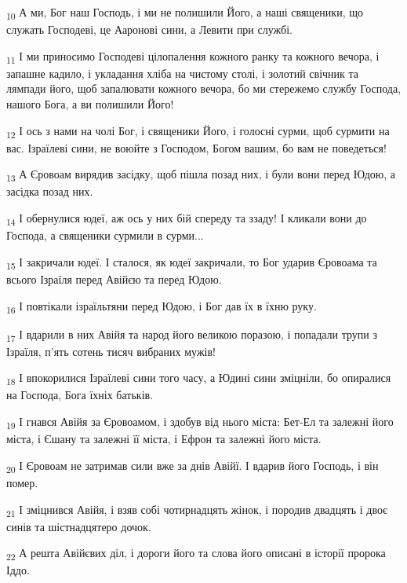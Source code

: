 \begin{tcolorbox}
\textsubscript{10} А ми, Бог наш Господь, і ми не полишили Його, а наші священики, що служать Господеві, це Ааронові сини, а Левити при службі.
\end{tcolorbox}
\begin{tcolorbox}
\textsubscript{11} І ми приносимо Господеві цілопалення кожного ранку та кожного вечора, і запашне кадило, і укладання хліба на чистому столі, і золотий свічник та лямпади його, щоб запалювати кожного вечора, бо ми стережемо службу Господа, нашого Бога, а ви полишили Його!
\end{tcolorbox}
\begin{tcolorbox}
\textsubscript{12} І ось з нами на чолі Бог, і священики Його, і голосні сурми, щоб сурмити на вас. Ізраїлеві сини, не воюйте з Господом, Богом вашим, бо вам не поведеться!
\end{tcolorbox}
\begin{tcolorbox}
\textsubscript{13} А Єровоам вирядив засідку, щоб пішла позад них, і були вони перед Юдою, а засідка позад них.
\end{tcolorbox}
\begin{tcolorbox}
\textsubscript{14} І обернулися юдеї, аж ось у них бій спереду та ззаду! І кликали вони до Господа, а священики сурмили в сурми...
\end{tcolorbox}
\begin{tcolorbox}
\textsubscript{15} І закричали юдеї. І сталося, як юдеї закричали, то Бог ударив Єровоама та всього Ізраїля перед Авійєю та перед Юдою.
\end{tcolorbox}
\begin{tcolorbox}
\textsubscript{16} І повтікали ізраїльтяни перед Юдою, і Бог дав їх в їхню руку.
\end{tcolorbox}
\begin{tcolorbox}
\textsubscript{17} І вдарили в них Авійя та народ його великою поразою, і попадали трупи з Ізраїля, п'ять сотень тисяч вибраних мужів!
\end{tcolorbox}
\begin{tcolorbox}
\textsubscript{18} І впокорилися Ізраїлеві сини того часу, а Юдині сини зміцніли, бо опиралися на Господа, Бога їхніх батьків.
\end{tcolorbox}
\begin{tcolorbox}
\textsubscript{19} І гнався Авійя за Єровоамом, і здобув від нього міста: Бет-Ел та залежні його міста, і Єшану та залежні її міста, і Ефрон та залежні його міста.
\end{tcolorbox}
\begin{tcolorbox}
\textsubscript{20} І Єровоам не затримав сили вже за днів Авійї. І вдарив його Господь, і він помер.
\end{tcolorbox}
\begin{tcolorbox}
\textsubscript{21} І зміцнився Авійя, і взяв собі чотирнадцять жінок, і породив двадцять і двоє синів та шістнадцятеро дочок.
\end{tcolorbox}
\begin{tcolorbox}
\textsubscript{22} А решта Авійєвих діл, і дороги його та слова його описані в історії пророка Іддо.
\end{tcolorbox}
